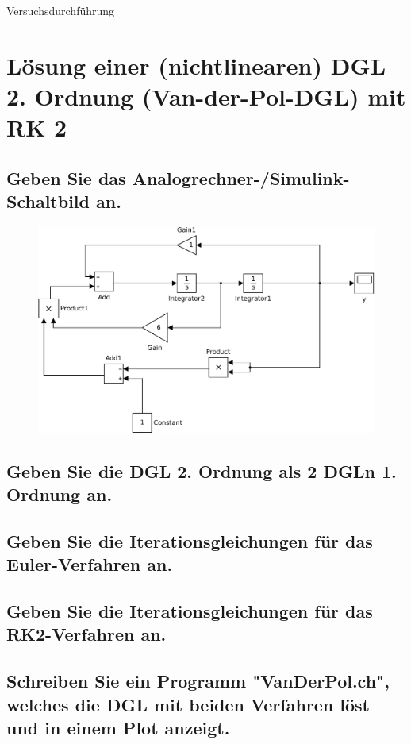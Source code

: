 \documentclass[10pt,a4paper]{article}
\begin{document}
\begin{center}
\begin{large}
Versuchsdurchführung
\end{large}
\end{center}


\section{Lösung einer (nichtlinearen) DGL 2. Ordnung (Van-der-Pol-DGL) mit RK 2}
\subsection{Geben Sie das Analogrechner-/Simulink-Schaltbild an.}
\begin{figure}[h]
\centering
\includegraphics[width=0.9\linewidth]{../screenshots/2}
\end{figure}
\subsection{Geben Sie die DGL 2. Ordnung als 2 DGLn 1. Ordnung an.}
\subsection{Geben Sie die Iterationsgleichungen für das Euler-Verfahren an.}
\subsection{Geben Sie die Iterationsgleichungen für das RK2-Verfahren an.}
\subsection{Schreiben Sie ein Programm "VanDerPol.ch", welches die DGL mit beiden
Verfahren löst und in einem Plot anzeigt.}
\end{document}
